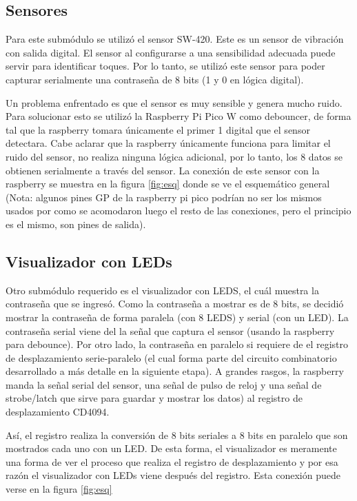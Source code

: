 \documentclass[conference]{IEEEtran}  %
\begin{document}
\subsection{Sensores}

Para este submódulo se utilizó el sensor SW-420. Este es un sensor de vibración con salida digital. El sensor al configurarse a una sensibilidad adecuada puede servir para identificar toques. Por lo tanto, se utilizó este sensor para poder capturar serialmente una contraseña de 8 bits (1 y 0 en lógica digital).

Un problema enfrentado es que el sensor es muy sensible y genera mucho ruido. Para solucionar esto se utilizó la Raspberry Pi Pico W como debouncer, de forma tal que la raspberry tomara únicamente el primer 1 digital que el sensor detectara. Cabe aclarar que la raspberry únicamente funciona para limitar el ruido del sensor, no realiza ninguna lógica adicional, por lo tanto, los 8 datos se obtienen serialmente a través del sensor. La conexión de este sensor con la raspberry se muestra en la figura \ref{fig:esq} donde se ve el esquemático general (Nota: algunos pines GP de la raspberry pi pico podrían no ser los mismos usados por como se acomodaron luego el resto de las conexiones, pero el principio es el mismo, son pines de salida).

\subsection{Visualizador con LEDs}

Otro submódulo requerido es el visualizador con LEDS, el cuál muestra la contraseña que se ingresó. Como la contraseña a mostrar es de 8 bits, se decidió mostrar la contraseña de forma paralela (con 8 LEDS) y serial (con un LED). La contraseña serial viene del la señal que captura el sensor (usando la raspberry para debounce). Por otro lado, la contraseña en paralelo si requiere de el registro de desplazamiento serie-paralelo (el cual forma parte del circuito combinatorio desarrollado a más detalle en la siguiente etapa). A grandes rasgos, la raspberry manda la señal serial del sensor, una señal de pulso de reloj y una señal de strobe/latch que sirve para guardar y mostrar los datos) al registro de desplazamiento CD4094. 

Así, el registro realiza la conversión de 8 bits seriales a 8 bits en paralelo que son mostrados cada uno con un LED. De esta forma, el visualizador es meramente una forma de ver el proceso que realiza el registro de desplazamiento y por esa razón el visualizador con LEDs viene después del registro. Esta conexión puede verse en la figura \ref{fig:esq}
\end{document}

